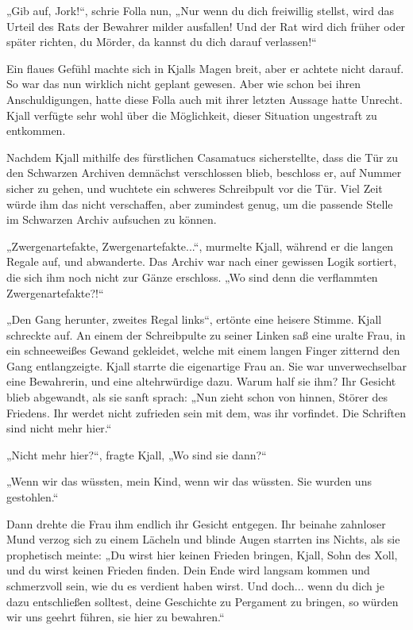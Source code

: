 \documentclass[10pt, a4paper, oneside]{book}
\begin{document}
„Gib auf, Jork!“, schrie Folla nun, „Nur wenn du dich freiwillig stellst, wird das Urteil des Rats der Bewahrer milder ausfallen! Und der Rat wird dich früher oder später richten, du Mörder, da kannst du dich darauf verlassen!“

Ein flaues Gefühl machte sich in Kjalls Magen breit, aber er achtete nicht darauf. So war das nun wirklich nicht geplant gewesen. Aber wie schon bei ihren Anschuldigungen, hatte diese Folla auch mit ihrer letzten Aussage hatte Unrecht. Kjall verfügte sehr wohl über die Möglichkeit, dieser Situation ungestraft zu entkommen.

Nachdem Kjall mithilfe des fürstlichen Casamatucs sicherstellte, dass die Tür zu den Schwarzen Archiven demnächst verschlossen blieb, beschloss er, auf Nummer sicher zu gehen, und wuchtete ein schweres Schreibpult vor die Tür. Viel Zeit würde ihm das nicht verschaffen, aber zumindest genug, um die passende Stelle im Schwarzen Archiv aufsuchen zu können.

„Zwergenartefakte, Zwergenartefakte...“, murmelte Kjall, während er die langen Regale auf, und abwanderte. Das Archiv war nach einer gewissen Logik sortiert, die sich ihm noch nicht zur Gänze erschloss. „Wo sind denn die verflammten Zwergenartefakte?!“

„Den Gang herunter, zweites Regal links“, ertönte eine heisere Stimme. Kjall schreckte auf. An einem der Schreibpulte zu seiner Linken saß eine uralte Frau, in ein schneeweißes Gewand gekleidet, welche mit einem langen Finger zitternd den Gang entlangzeigte. Kjall starrte die eigenartige Frau an. Sie war unverwechselbar eine Bewahrerin, und eine altehrwürdige dazu. Warum half sie ihm? Ihr Gesicht blieb abgewandt, als sie sanft sprach: „Nun zieht schon von hinnen, Störer des Friedens. Ihr werdet nicht zufrieden sein mit dem, was ihr vorfindet. Die Schriften sind nicht mehr hier.“

„Nicht mehr hier?“, fragte Kjall, „Wo sind sie dann?“

„Wenn wir das wüssten, mein Kind, wenn wir das wüssten. Sie wurden uns gestohlen.“

Dann drehte die Frau ihm endlich ihr Gesicht entgegen. Ihr beinahe zahnloser Mund verzog sich zu einem Lächeln und blinde Augen starrten ins Nichts, als sie prophetisch meinte: „Du wirst hier keinen Frieden bringen, Kjall, Sohn des Xoll, und du wirst keinen Frieden finden. Dein Ende wird langsam kommen und schmerzvoll sein, wie du es verdient haben wirst. Und doch... wenn du dich je dazu entschließen solltest, deine Geschichte zu Pergament zu bringen, so würden wir uns geehrt führen, sie hier zu bewahren.“
\end{document}
